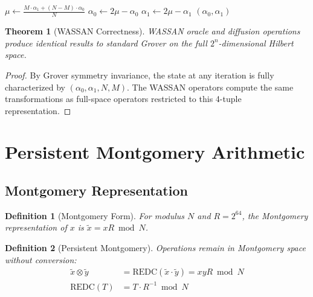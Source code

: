 \documentclass[11pt,a4paper]{article}
\newtheorem{theorem}{Theorem}
\newtheorem{definition}{Definition}
\begin{document}
\begin{algorithm}
\caption{WASSAN Diffusion}
\begin{algorithmic}[1]
    \State $\mu \gets \frac{M \cdot \alpha_1 + (N-M) \cdot \alpha_0}{N}$ 
    \State $\alpha_0 \gets 2\mu - \alpha_0$ 
    \State $\alpha_1 \gets 2\mu - \alpha_1$ 
    \State \Return $(\alpha_0, \alpha_1)$
\EndProcedure
\end{algorithmic}
\end{algorithm}

\begin{theorem}[WASSAN Correctness]
WASSAN oracle and diffusion operations produce identical results to standard Grover on the full $2^n$-dimensional Hilbert space.
\end{theorem}

\begin{proof}
By Grover symmetry invariance, the state at any iteration is fully characterized by $(\alpha_0, \alpha_1, N, M)$. The WASSAN operators compute the same transformations as full-space operators restricted to this 4-tuple representation.
\end{proof}

\section{Persistent Montgomery Arithmetic}

\subsection{Montgomery Representation}

\begin{definition}[Montgomery Form]
For modulus $N$ and $R = 2^{64}$, the Montgomery representation of $x$ is $\tilde{x} = xR \bmod N$.
\end{definition}

\begin{definition}[Persistent Montgomery]
Operations remain in Montgomery space without conversion:
\begin{align}
\tilde{x} \otimes \tilde{y} &= \text{REDC}(\tilde{x} \cdot \tilde{y}) = xyR \bmod N \\
\text{REDC}(T) &= T \cdot R^{-1} \bmod N
\end{align}
\end{definition}
\end{document}
